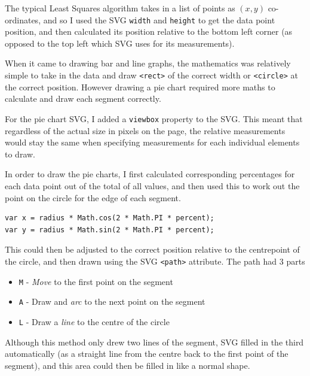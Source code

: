 \documentclass[ %
                    author={Aleena Baig},
                supervisor={Dr Simon Lock},
                    degree={BSc},
                     title={On Making Web Accessible Graphs},
                  subtitle={},
                      year={2019} ]{dissertation}
\begin{document}
The typical Least Squares algorithm takes in a list of points as $(x,y)$ co-ordinates, and so I used the SVG \texttt{width} and \texttt{height} to get the data point position, and then calculated its position relative to the bottom left corner (as opposed to the top left which SVG uses for its measurements).

When it came to drawing bar and line graphs, the mathematics was relatively simple to take in the data and draw \texttt{<rect>} of the correct width or \texttt{<circle>} at the correct position. However drawing a pie chart required more maths to calculate and draw each segment correctly.

For the pie chart SVG, I added a \texttt{viewbox} property to the SVG. This meant that regardless of the actual size in pixels on the page, the relative measurements would stay the same when specifying measurements for each individual elements to draw.

In order to draw the pie charts, I first calculated corresponding percentages for each data point out of the total of all values, and then used this to work out the point on the circle for the edge of each segment.

\begin{lstlisting}
var x = radius * Math.cos(2 * Math.PI * percent);
var y = radius * Math.sin(2 * Math.PI * percent);
\end{lstlisting}

This could then be adjusted to the correct position relative to the centrepoint of the circle, and then drawn using the SVG \texttt{<path>} attribute. The path had 3 parts

\begin{itemize}
    \item \texttt{M} - \textit{Move} to the first point on the segment
    \item \texttt{A} - Draw and \textit{arc} to the next point on the segment
    \item \texttt{L} - Draw a \textit{line} to the centre of the circle
\end{itemize}

Although this method only drew two lines of the segment, SVG filled in the third automatically (as a straight line from the centre back to the first point of the segment), and this area could then be filled in like a normal shape.


\end{document}
